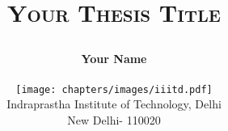 \documentclass[12pt,a4paper,twoside]{report}
\title{
    \vspace{-2in}
    \Huge
    \textsc{Your Thesis Title}\\
    
    \author{
        {\Huge\textbf{\color{DarkSlateGrey} Your Name}}\\
        \centerline{\texttt{[image: chapters/images/iiitd.pdf]}}
        {\normalsize Indraprastha Institute of Technology, Delhi\par 
        New Delhi- 110020
        }\\

    }
}
\date{}
\begin{document}
%  
\maketitle
\cleardoublepage

\frontmatter

\begin{spacing}{1}
\tableofcontents
\end{spacing}

\mainmatter

\cleardoublepage
\backmatter
 \begin{spacing}{1}
    {\tiny\printbibliography}
\end{spacing}
\end{document}
